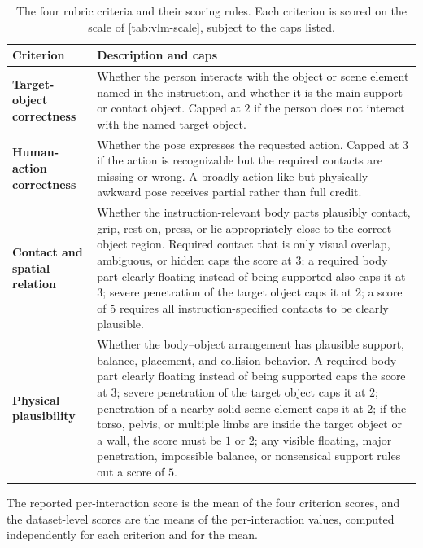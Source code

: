 \begin{table}[t]
  \centering
  \caption[Vision-language rubric criteria and scoring rules.]{The four rubric criteria and their scoring rules. Each criterion is scored on the scale of \cref{tab:vlm-scale}, subject to the caps listed.}
  \label{tab:vlm-criteria}
  \begin{tabularx}{\textwidth}{@{}>{\bfseries}p{}X@{}}
    \toprule
    Criterion & Description and caps \\
    \midrule
    Target-object correctness &
    Whether the person interacts with the object or scene element named in the instruction, and whether it is the main support or contact object. Capped at $2$ if the person does not interact with the named target object. \\
    \addlinespace
    Human-action correctness &
    Whether the pose expresses the requested action. Capped at $3$ if the action is recognizable but the required contacts are missing or wrong. A broadly action-like but physically awkward pose receives partial rather than full credit. \\
    \addlinespace
    Contact and spatial relation &
    Whether the instruction-relevant body parts plausibly contact, grip, rest on, press, or lie appropriately close to the correct object region. Required contact that is only visual overlap, ambiguous, or hidden caps the score at $3$; a required body part clearly floating instead of being supported also caps it at $3$; severe penetration of the target object caps it at $2$; a score of $5$ requires all instruction-specified contacts to be clearly plausible. \\
    \addlinespace
    Physical plausibility &
    Whether the body--object arrangement has plausible support, balance, placement, and collision behavior. A required body part clearly floating instead of being supported caps the score at $3$; severe penetration of the target object caps it at $2$; penetration of a nearby solid scene element caps it at $2$; if the torso, pelvis, or multiple limbs are inside the target object or a wall, the score must be $1$ or $2$; any visible floating, major penetration, impossible balance, or nonsensical support rules out a score of $5$. \\
    \bottomrule
  \end{tabularx}
\end{table}
 
The reported per-interaction score is the mean of the four criterion scores, and the dataset-level scores are the means of the per-interaction values, computed independently for each criterion and for the mean.
 
